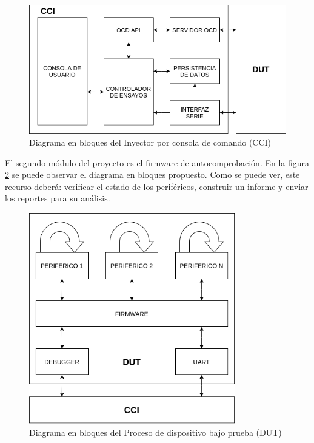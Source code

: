 \documentclass[
11pt, %
]{charter}
\begin{document}
\begin{figure}[htpb]
	\centering 
	\includegraphics[width=\textwidth]{./Figuras/CCIbloques.png}
	\caption{Diagrama en bloques del Inyector por consola de comando (CCI)}
	\label{fig:diagInyector}
\end{figure}

El segundo módulo del proyecto es el firmware de autocomprobación.
En la figura \ref{fig:diagSelfTesting} se puede observar el diagrama en bloques propuesto.
Como se puede ver, este recurso deberá: verificar el estado de los periféricos, construir un informe y enviar los reportes para su análisis.

\begin{figure}[htpb]
	\centering 
	\includegraphics[width=0.8\textwidth]{./Figuras/DUTbloques.png}
	\caption{Diagrama en bloques del Proceso de dispositivo bajo prueba (DUT)}
	\label{fig:diagSelfTesting}
\end{figure}
\end{document}
